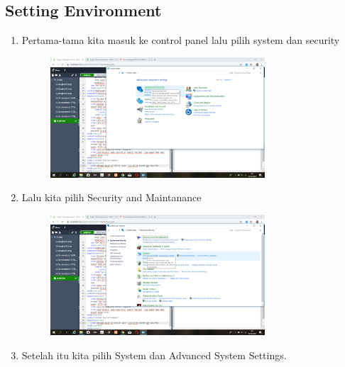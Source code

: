 \documentclass{article}
\begin{document}
\subsection{Setting Environment}
\begin{enumerate}
    \item Pertama-tama kita masuk ke control panel lalu pilih system dan security
        \begin{figure}[h]
            \centerline{\includegraphics[width=8cm]{image/cpanel.png}}
        \end{figure}
    \item Lalu kita pilih Security and Maintanance
        \begin{figure}[h]
            \centerline{\includegraphics[width=8cm]{image/securityandmain.png}}
        \end{figure}
    \item Setelah itu kita pilih System dan Advanced System Settings.

\end{enumerate}
\end{document}
